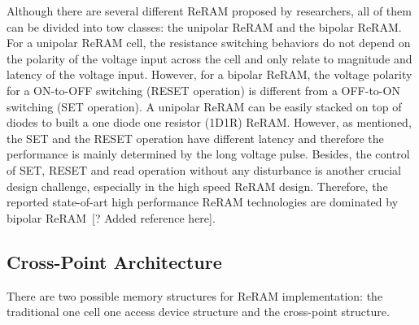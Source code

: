 Although there are several different ReRAM proposed by researchers, all of them can be divided into tow classes: the unipolar ReRAM and the bipolar ReRAM. For a unipolar ReRAM cell, the resistance switching behaviors do not depend on the polarity of the voltage input across the cell and only relate to magnitude and latency of the voltage input. However, for a bipolar ReRAM, the voltage polarity for a ON-to-OFF switching (RESET operation) is different from a OFF-to-ON switching (SET operation). A unipolar ReRAM can be easily stacked on top of diodes to built a one diode one resistor (1D1R) ReRAM. However, as mentioned, the SET and the RESET operation have different latency and therefore the performance is mainly determined by the long voltage pulse. Besides, the control of SET, RESET and read operation without any disturbance is another crucial design challenge, especially in the high speed ReRAM design. Therefore, the reported state-of-art high performance ReRAM technologies are dominated by bipolar ReRAM~[? Added reference here].

\subsection{Cross-Point Architecture}
There are two possible memory structures for ReRAM implementation: the traditional one cell one access device structure and the cross-point structure. 

